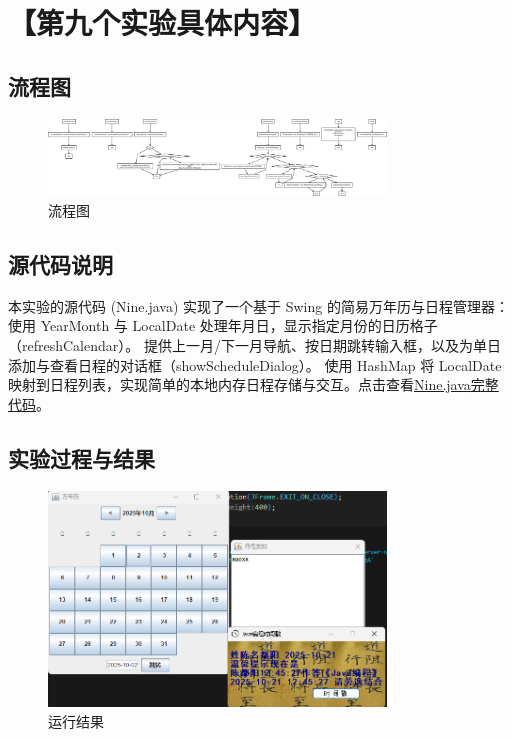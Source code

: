 \documentclass[12pt,a4paper]{article}
\begin{document}
\section*{【第九个实验具体内容】}
\subsection*{流程图}

\begin{figure}[H]
\centering
\includegraphics[width=0.8\textwidth,height=0.8\textheight,keepaspectratio]{ninea1.png}
\caption{流程图}
\end{figure}

\subsection*{源代码说明}
本实验的源代码 (Nine.java) 实现了一个基于 Swing 的简易万年历与日程管理器：
使用 YearMonth 与 LocalDate 处理年月日，显示指定月份的日历格子（refreshCalendar）。
提供上一月/下一月导航、按日期跳转输入框，以及为单日添加与查看日程的对话框（showScheduleDialog）。
使用 HashMap 将 LocalDate 映射到日程列表，实现简单的本地内存日程存储与交互。点击查看\hyperref[sec:nine]{Nine.java完整代码}。    

\subsection*{实验过程与结果}

\begin{figure}[H]
\centering
\includegraphics[width=0.8\textwidth,height=0.8\textheight,keepaspectratio]{ninea.png}
\caption{运行结果}
\end{figure}
\end{document}
